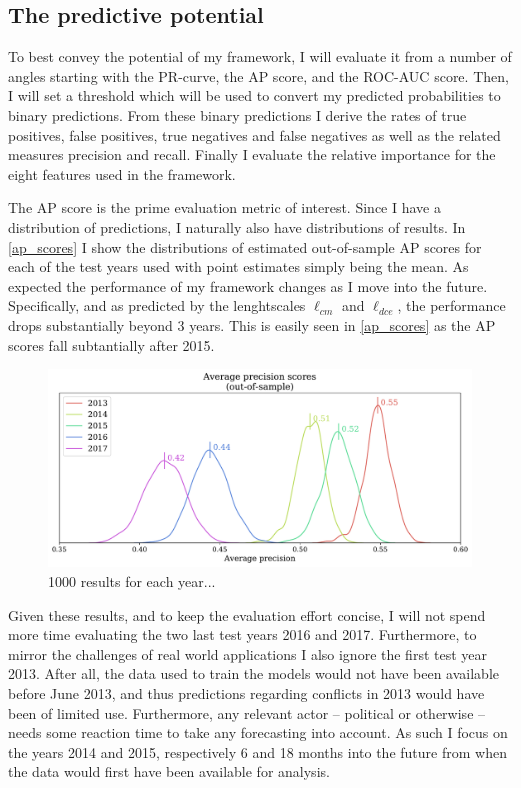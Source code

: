 \documentclass[a4paper]{article}
\begin{document}
\subsection{The predictive potential}

To best convey the potential of my framework, I will evaluate it from a number of angles starting with the PR-curve, the AP score, and the ROC-AUC score. Then, I will set a threshold which will be used to convert my predicted probabilities to binary predictions. From these binary predictions I derive the rates of true positives, false positives, true negatives and false negatives as well as the related measures precision and recall. Finally I evaluate the relative importance for the eight features used in the framework.\par

The AP score is the prime evaluation metric of interest. Since I have a distribution of predictions, I naturally also have distributions of results. In \autoref{ap_scores} I show the distributions of estimated out-of-sample AP scores for each of the test years used with point estimates simply being the mean. As expected the performance of my framework changes as I move into the future. Specifically, and as predicted by the lenghtscales $\ell_{cm}$ and $\ell_{dce}$, the performance drops substantially beyond 3 years. This is easily seen in \autoref{ap_scores} as the AP scores fall subtantially after 2015.\par

\begin{figure}[!htb]
	\centering
	\includegraphics[scale=0.47]{ap_scores.pdf}
    \caption{\footnotesize{1000 results for each year...}}\label{ap_scores}
\end{figure}

Given these results, and to keep the evaluation effort concise, I will not spend more time evaluating the two last test years 2016 and 2017. Furthermore, to mirror the challenges of real world applications I also ignore the first test year 2013. After all, the data used to train the models would not have been available before June 2013, and thus predictions regarding conflicts in 2013 would have been of limited use. Furthermore, any relevant actor -- political or otherwise -- needs some reaction time to take any forecasting into account. As such I focus on the years 2014 and 2015, respectively 6 and 18 months into the future from when the data would first have been available for analysis.\par
\end{document}
